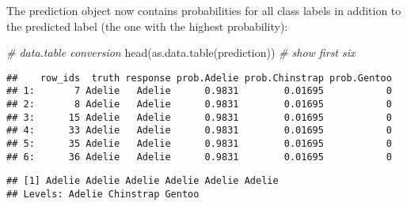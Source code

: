 \documentclass[
]{scrbook}
\newenvironment{Shaded}{\begin{snugshade}}{\end{snugshade}}
\newcommand{\AttributeTok}[1]{\textcolor[rgb]{0.77,0.63,0.00}{#1}}
\newcommand{\CommentTok}[1]{\textcolor[rgb]{0.56,0.35,0.01}{\textit{#1}}}
\newcommand{\FunctionTok}[1]{\textcolor[rgb]{0.00,0.00,0.00}{#1}}
\newcommand{\NormalTok}[1]{#1}
\newcommand{\OtherTok}[1]{\textcolor[rgb]{0.56,0.35,0.01}{#1}}
\newcommand{\SpecialCharTok}[1]{\textcolor[rgb]{0.00,0.00,0.00}{#1}}
\newcommand{\StringTok}[1]{\textcolor[rgb]{0.31,0.60,0.02}{#1}}
\renewenvironment{Shaded} {\begin{snugshade}\small} {\end{snugshade}}
\begin{document}
\begin{Shaded}
\end{Shaded}

The prediction object now contains probabilities for all class labels in addition to the predicted label (the one with the highest probability):

\begin{Shaded}
\begin{Highlighting}[]
\CommentTok{\# data.table conversion}
\FunctionTok{head}\NormalTok{(}\FunctionTok{as.data.table}\NormalTok{(prediction)) }\CommentTok{\# show first six}
\end{Highlighting}
\end{Shaded}

\begin{verbatim}
##    row_ids  truth response prob.Adelie prob.Chinstrap prob.Gentoo
## 1:       7 Adelie   Adelie      0.9831        0.01695           0
## 2:       8 Adelie   Adelie      0.9831        0.01695           0
## 3:      15 Adelie   Adelie      0.9831        0.01695           0
## 4:      33 Adelie   Adelie      0.9831        0.01695           0
## 5:      35 Adelie   Adelie      0.9831        0.01695           0
## 6:      36 Adelie   Adelie      0.9831        0.01695           0
\end{verbatim}

\begin{Shaded}
\end{Shaded}

\begin{verbatim}
## [1] Adelie Adelie Adelie Adelie Adelie Adelie
## Levels: Adelie Chinstrap Gentoo
\end{verbatim}
\end{document}

